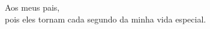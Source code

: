 \begin{center}
\Large{\textbf{}}
\end{center}

 \vspace{20cm}
 \hspace*{12.8cm}Aos meus pais,\\
 \hspace*{6.48cm}pois eles tornam cada segundo da minha vida especial.\\

